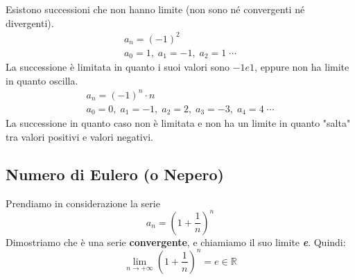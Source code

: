 

Esistono successioni che non hanno limite (non sono né convergenti né divergenti).
\begin{gather*}
    a_n = (-1)^2\\
    a_0 = 1,\; a_1 = -1,\; a_2 = 1 \;\cdots
\end{gather*}
La successione è limitata in quanto i suoi valori sono $-1 e 1$, eppure non ha limite in quanto oscilla.
\begin{gather*}
    a_n = (-1)^n \cdot n\\
    a_0 = 0,\; a_1 = -1,\; a_2 = 2,\; a_3 = -3,\; a_4 = 4 \;\cdots
\end{gather*}
La successione in quanto caso non è limitata e non ha un limite in quanto "salta" tra valori positivi e valori negativi.

\subsection{Numero di Eulero (o Nepero)} \label{sec_numeroDiEulero}
Prendiamo in considerazione la serie
\begin{equation*}
    a_n = \left(1+\dfrac{1}{n} \right)^n
\end{equation*}
Dimostriamo che è una serie \textbf{convergente}, e chiamiamo il suo limite \textbf{\textit{e}}. Quindi:
\begin{equation*}
    \lim_{n\to +\infty} \left(1+\dfrac{1}{n}\right)^n = e \in \mathbb{R}
\end{equation*}

